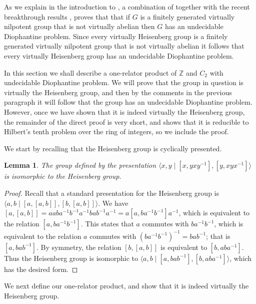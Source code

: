 \documentclass[11pt]{amsart}
\newtheorem{lem}[theorem]{Lemma}
\theoremstyle{definition}
\numberwithin{theorem}{section}
\newcommand{\Z}{\mathbb{Z}}
\begin{document}
As we explain in the introduction to \cite{GrayLevineArxiv251207690}, a combination of \cite[Corollary 4.29]{Garreta2020} together with the recent breakthrough results \cite{Levent2026, koymans2024hilbert}, proves that  that if $G$ is a finitely generated virtually nilpotent group that is not virtually abelian then $G$ has an undecidable Diophantine problem. Since every virtually Heisenberg group is a finitely generated virtually nilpotent group that is not virtually abelian it follows that every virtually Heisenberg group has an undecidable Diophantine problem.  

In this section we shall describe a one-relator product of \(\Z\) and \(C_2\) with undecidable Diophantine problem. We will prove that the group in question is virtually the Heisenberg group, and then by the comments in the previous paragraph it will follow that the group has an undecidable Diophantine problem. However, once we have shown that it is indeed virtually the Heisenberg group, the remainder of the direct proof is very short, and shows that it is reducible to Hilbert's tenth problem over the ring of integers, so we include the proof. 

We start by recalling that the Heisenberg group is cyclically presented.

\begin{lem}
  \label{lem:Heisenberg-pres}
  The group defined by the presentation \(\langle x, y \mid [x, yxy^{-1}],
  [y, xyx^{-1}]\rangle\) is isomorphic to the Heisenberg group.
\end{lem}

\begin{proof}
  Recall that a standard presentation for the Heisenberg group is
  \(\langle a, b \mid [a, [a, b]], [b, [a, b]] \rangle\).
  We have \([a, [a, b]] = a aba^{-1} b^{-1} a^{-1} bab^{-1}a^{-1} = a [a,
  ba^{-1} b^{-1}] a^{-1}\), which is equivalent to the relation \([a, ba^{-1}
  b^{-1}]\). This states that \(a\) commutes with \(ba^{-1}b^{-1}\), which
  is equivalent to the relation \(a\) commutes with \((ba^{-1}b^{-1})^{-1} =
  bab^{-1}\); that is \([a, bab^{-1}]\).
  By symmetry, the relation \([b, [a, b]]\) is equivalent to \([b,
  aba^{-1}]\). Thus the Heisenberg group is isomorphic to \(\langle a, b
  \mid [a, bab^{-1}], [b, aba^{-1}] \rangle\), which has the desired form.
\end{proof}

We next define our one-relator product, and show that it is indeed virtually
	the Heisenberg group. 
\end{document}

